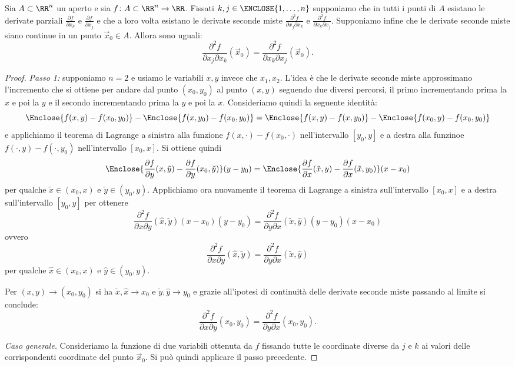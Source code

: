 \begin{theorem}[Schwarz]
Sia $A\subset \RR^n$ un aperto 
e sia $f\colon A \subset \RR^n \to \RR$.
Fissati $k,j\in \ENCLOSE{1,\dots,n}$
supponiamo che in tutti i punti di $A$ esistano le derivate parziali 
$\frac{\partial f}{\partial x_k}$ 
e $\frac{\partial f}{\partial x_j}$
e che a loro volta esistano le derivate seconde miste 
$\frac{\partial^2 f}{\partial x_j \partial x_k}$
e $\frac{\partial^2 f}{\partial x_k \partial x_j}$.
Supponiamo infine che le derivate seconde miste siano continue 
in un punto $\vec x_0\in A$. Allora sono uguali:
\[
 \frac{\partial^2 f}{\partial x_j \partial x_k}(\vec x_0)
 = \frac{\partial^2 f}{\partial x_k \partial x_j}(\vec x_0).
\]
\end{theorem}
%
\begin{proof}
  \emph{Passo 1:} supponiamo $n=2$ e usiamo le variabili $x,y$ invece che 
  $x_1,x_2$. 
L'idea è che le derivate seconde miste approssimano l'incremento che si ottiene 
per andare dal punto $(x_0,y_0)$ al punto $(x,y)$ seguendo due diversi percorsi,
il primo incrementando prima la $x$ e poi la $y$ e il secondo 
incrementando prima la $y$ e poi la $x$.
Consideriamo quindi la seguente identità:
\[
\Enclose{f(x,y)-f(x_0,y_0)} - \Enclose{f(x,y_0) - f(x_0,y_0)}
= \Enclose{f(x,y) - f(x,y_0)} - \Enclose{f(x_0,y) - f(x_0, y_0)}
\]
e applichiamo il teorema di Lagrange 
a sinistra alla funzione $f(x,\cdot) - f(x_0,\cdot)$ nell'intervallo $[y_0,y]$ 
e a destra alla funzinoe $f(\cdot,y) - f(\cdot,y_0)$ nell'intervallo $[x_0,x]$.
Si ottiene quindi
\[
\Enclose{\frac{\partial f}{\partial y}(x,\tilde y)-\frac{\partial f}{\partial y}(x_0,\tilde y)}(y-y_0)
= \Enclose{\frac{\partial f}{\partial x}(\tilde x,y)-\frac{\partial f}{\partial x}(\tilde x,y_0)}(x-x_0)
\]
per qualche $\tilde x \in (x_0,x)$ e $\tilde y \in (y_0,y)$.
Applichiamo ora nuovamente il teorema di Lagrange a sinistra
sull'intervallo $[x_0,x]$ e a destra sull'intervallo $[y_0,y]$ 
per ottenere
\[
\frac{\partial^2 f}{\partial x\partial y}(\hat x,\tilde y)(x-x_0)(y-y_0)
= \frac{\partial^2 f}{\partial y\partial x}(\tilde x,\hat y)(y-y_0)(x-x_0)
\]
ovvero
\[
\frac{\partial^2 f}{\partial x\partial y}(\hat x,\tilde y)
= \frac{\partial^2 f}{\partial y\partial x}(\tilde x,\hat y)
\]
per qualche $\hat x \in (x_0,x)$ e $\hat y \in (y_0,y)$.

Per $(x,y)\to(x_0,y_0)$ si ha $\tilde x, \hat x \to x_0$ e $\tilde y, \hat y\to y_0$
e grazie all'ipotesi di continuità delle derivate seconde miste 
passando al limite si conclude:
\[
\frac{\partial^2 f}{\partial x\partial y}(x_0, y_0)
= \frac{\partial^2 f}{\partial y\partial x}(x_0, y_0).  
\]

\emph{Caso generale.}
Consideriamo la funzione di due variabili ottenuta da $f$ fissando 
tutte le coordinate diverse da $j$ e $k$ ai valori delle corrispondenti 
coordinate del punto $\vec x_0$. 
Si può quindi applicare il passo precedente.
\end{proof}

